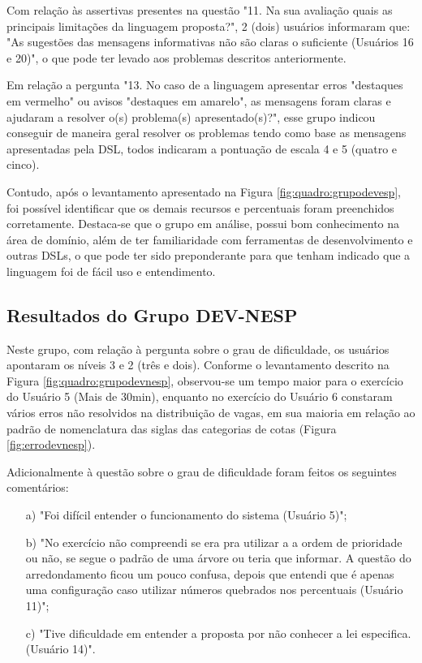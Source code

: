 

Com relação às assertivas presentes na questão "11. Na sua avaliação quais as principais limitações da linguagem proposta?", 2 (dois) usuários informaram que: "As sugestões das mensagens informativas não são claras o suficiente (Usuários 16 e 20)", o que pode ter levado aos problemas descritos anteriormente.

Em relação a pergunta "13. No caso de a linguagem apresentar erros "destaques em vermelho" ou avisos "destaques em amarelo", as mensagens foram claras e ajudaram a resolver o(s) problema(s) apresentado(s)?", esse grupo indicou conseguir de maneira geral resolver os problemas tendo como base as mensagens apresentadas pela DSL, todos indicaram a pontuação de escala 4 e 5 (quatro e cinco).

Contudo, após o levantamento apresentado na Figura \ref{fig:quadro:grupodevesp}, foi possível identificar que os demais recursos e percentuais foram preenchidos corretamente. Destaca-se que o grupo em análise, possui bom conhecimento na área de domínio, além de ter familiaridade com ferramentas de desenvolvimento e outras \gls{DSL}s, o que pode ter sido preponderante para que tenham indicado que a linguagem foi de fácil uso e entendimento. 

\newpage
\subsection{Resultados do Grupo DEV-NESP}
\label{subsec:devnesp}

Neste grupo, com relação à pergunta sobre o grau de dificuldade, os usuários apontaram os níveis 3 e 2 (três e dois).  Conforme o levantamento descrito na Figura \ref{fig:quadro:grupodevnesp},  observou-se um tempo maior para o exercício do Usuário 5 (Mais de 30min), enquanto no exercício do Usuário 6 constaram vários erros não resolvidos na distribuição de vagas, em sua maioria em relação ao padrão de nomenclatura das siglas das categorias de cotas (Figura \ref{fig:errodevnesp}). 







Adicionalmente à questão sobre o grau de dificuldade foram feitos os seguintes comentários:

\begin{enumerate}
    \item [a)] "Foi difícil entender o funcionamento do sistema (Usuário 5)";
    \item [b)] "No exercício não compreendi se era pra utilizar a a ordem de prioridade ou não, se segue o padrão de uma árvore ou teria que informar. A questão do arredondamento ficou um pouco confusa, depois que entendi que é apenas uma configuração caso utilizar números quebrados nos percentuais (Usuário 11)";
    \item [c)] "Tive dificuldade em entender a proposta por não conhecer a lei especifica.  (Usuário 14)".    
\end{enumerate}

